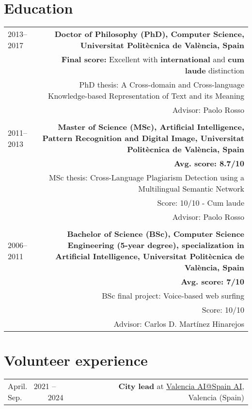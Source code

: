 \documentclass[10pt]{article}
\begin{document}
\section*{Education}
\begin{tabular}{L!{\VRule}R}
	2013--2017 &{\bf Doctor of Philosophy (PhD), Computer Science, Universitat Polit{\`e}cnica de Val{\`e}ncia, Spain}\vspace{5pt}\\
	&\textbf{Final score:} Excellent  with \textbf{international} and \textbf{cum laude} distinction\\
	&\scriptsize{PhD thesis: A Cross-domain and Cross-language Knowledge-based Representation of Text and its Meaning}\\
	&\scriptsize{Advisor: Paolo Rosso}\\
	&\\
	2011--2013&{\bf Master of Science (MSc), Artificial Intelligence, Pattern Recognition and Digital Image, Universitat Polit{\`e}cnica de Val{\`e}ncia, Spain}\vspace{5pt}\\
	&\bf Avg. score: 8.7/10\\
	&\scriptsize{MSc thesis: Cross-Language Plagiarism Detection using a Multilingual Semantic Network}\\
	&\scriptsize{Score: 10/10  -  Cum laude}\\
	&\scriptsize{Advisor: Paolo Rosso}\\
	&\\
	2006--2011& \bf Bachelor of Science (BSc), Computer Science Engineering (5-year degree), specialization in Artificial Intelligence, Universitat Polit{\`e}cnica de Val{\`e}ncia, Spain\vspace{5pt}\\
	&\bf Avg. score: 7/10\\
	&\scriptsize{BSc final project: Voice-based web surfing}\\
	&\scriptsize{Score: 10/10}\\
	&\scriptsize{Advisor: Carlos D. Mart\'inez Hinarejos}\\ 
\end{tabular}

\section*{Volunteer experience}
\begin{tabular}{L!{\VRule}R}
April.~ 2021 -- Sep.~~~~~~ 2024 &{\textbf{City lead} at \href{https://www.spain-ai.com/}{Valencia AI@Spain AI}, Valencia (Spain)}\\
\end{tabular}
\end{document}
